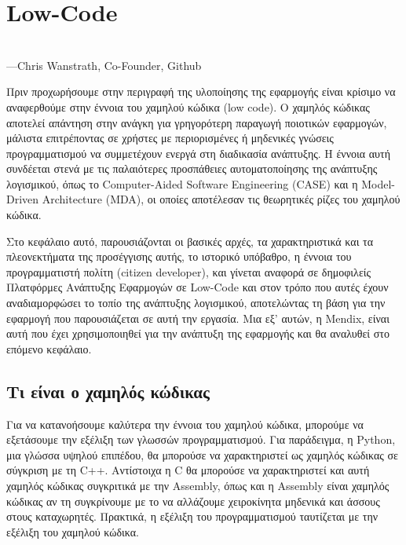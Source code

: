 \chapter{Low-Code} \label{ch:low-code}
    \begin{displayquote} \centering
         \\
        \hspace*{\fill}---Chris Wanstrath, Co-Founder, Github
    \end{displayquote}
    \vspace{1em}

    Πριν προχωρήσουμε στην περιγραφή της υλοποίησης της εφαρμογής είναι κρίσιμο να αναφερθούμε στην έννοια του χαμηλού κώδικα (low code). Ο χαμηλός κώδικας αποτελεί απάντηση στην ανάγκη για γρηγορότερη παραγωγή ποιοτικών εφαρμογών, μάλιστα επιτρέποντας σε χρήστες με περιορισμένες ή μηδενικές γνώσεις προγραμματισμού να συμμετέχουν ενεργά στη διαδικασία ανάπτυξης. Η έννοια αυτή συνδέεται στενά με τις παλαιότερες προσπάθειες αυτοματοποίησης της ανάπτυξης λογισμικού, όπως το Computer-Aided Software Engineering (CASE) και η Model-Driven Architecture (MDA), οι οποίες αποτέλεσαν τις θεωρητικές ρίζες του χαμηλού κώδικα.

    Στο κεφάλαιο αυτό, παρουσιάζονται οι βασικές αρχές, τα χαρακτηριστικά και τα πλεονεκτήματα της προσέγγισης αυτής, το ιστορικό υπόβαθρο, η έννοια του προγραμματιστή πολίτη (citizen developer), και γίνεται αναφορά σε δημοφιλείς Πλατφόρμες Ανάπτυξης Εφαρμογών σε Low-Code και στον τρόπο που αυτές έχουν αναδιαμορφώσει το τοπίο της ανάπτυξης λογισμικού, αποτελώντας τη βάση για την εφαρμογή που παρουσιάζεται σε αυτή την εργασία. Μια εξ' αυτών, η Mendix, είναι αυτή που έχει χρησιμοποιηθεί για την ανάπτυξη της εφαρμογής και θα αναλυθεί στο επόμενο κεφάλαιο.


    \section{Τι είναι ο χαμηλός κώδικας}
        \begin{displayquote} \justifying
             \cite{Ibm_2024}
        \end{displayquote}

        Για να κατανοήσουμε καλύτερα την έννοια του χαμηλού κώδικα, μπορούμε να εξετάσουμε την εξέλιξη των γλωσσών προγραμματισμού. Για παράδειγμα, η Python, μια γλώσσα υψηλού επιπέδου, θα μπορούσε να χαρακτηριστεί ως χαμηλός κώδικας σε σύγκριση με τη C++. Αντίστοιχα η C θα μπορούσε να χαρακτηριστεί και αυτή χαμηλός κώδικας συγκριτικά με την Assembly, όπως και η Assembly είναι χαμηλός κώδικας αν τη συγκρίνουμε με το να αλλάζουμε χειροκίνητα μηδενικά και άσσους στους καταχωρητές. Πρακτικά, η εξέλιξη του προγραμματισμού ταυτίζεται με την εξέλιξη του χαμηλού κώδικα.

